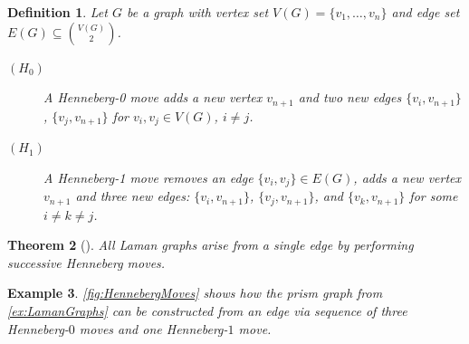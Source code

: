 \documentclass[11pt,reqno,a4paper]{amsart}
\theoremstyle{theoremstyle}
\newtheorem{theorem}{Theorem}[section]
\theoremstyle{examplestyle}
\newtheorem{example}[theorem]{Example}
\newtheorem{definition}[theorem]{Definition}
\theoremstyle{algorithmstyle}
\begin{document}
\begin{definition}
  \label{def:hennebergMoves}
  Let $G$ be a graph with vertex set $V(G)=\{v_1,\dots,v_n\}$ and edge set $E(G)\subseteq\binom{V(G)}{2}$.

\begin{description}
    \item[$(H_0)$] A \emph{Henneberg-0 move} adds a new vertex $v_{n+1}$ and two new edges $\{v_{i},v_{n+1}\}$, $\{v_{j},v_{n+1}\}$ for $v_i,v_j\in V(G)$, $i\neq j$.
    \item[$(H_1)$] A \emph{Henneberg-1 move} removes an edge $\{v_i,v_j\}\in E(G)$, adds a new vertex $v_{n+1}$ and three new edges: $\{v_{i},v_{n+1}\}$, $\{v_{j},v_{n+1}\}$, and $\{v_{k},v_{n+1}\}$ for some $i\neq k\neq j$.
\end{description}
\end{definition}

\begin{theorem}[{\cite{Henneberg1911}}]
  \label{thm:henneberg}
  All Laman graphs arise from a single edge by performing successive Henneberg moves.
\end{theorem}

\begin{example}
  \label{ex:HennebergMoves}
  \cref{fig:HennebergMoves} shows how the prism graph from \cref{ex:LamanGraphs} can be constructed from an edge via sequence of three Henneberg-$0$ moves and one Henneberg-$1$ move.
\end{example}
\end{document}
